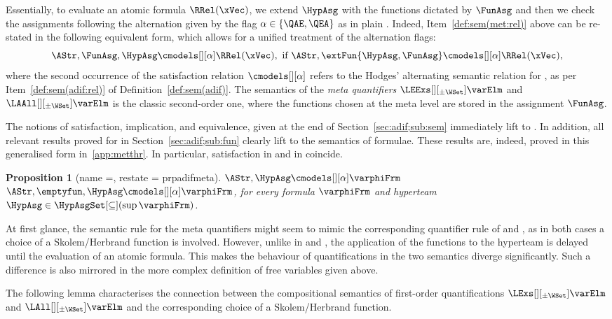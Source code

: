 \documentclass[authoryear]{elsarticle}
\newtheorem{proposition}{Proposition}
\begin{document}
Essentially, to evaluate an atomic formula $\RRel(\xVec)$, we extend $\HypAsg$
with the functions dictated by $\FunAsg$ and then we check the assignments
following the alternation given by the flag $\alpha \in \{\QAE,\QEA\}$ as in
plain \ADIF.
Indeed, Item~\ref{def:sem(met:rel)} above can be re-stated in the following
equivalent form, which allows for a unified treatment of the alternation flags:
\[
  \AStr, \FunAsg, \HypAsg \cmodels[][\alpha] \RRel(\xVec),
\text{\ if }
  \AStr, \extFun{\HypAsg, \FunAsg} \cmodels[][\alpha] \RRel(\xVec),
\]
where the second occurrence of the satisfaction relation $\cmodels[][\alpha]$
refers to the Hodges' alternating semantic relation for \ADIF, as per
Item~\ref{def:sem(adif:rel)} of Definition~\ref{def:sem(adif)}.
%
The semantics of the \emph{meta quantifiers} $\LEExs[][_{\pm\WSet}] \varElm$ and
$\LAAll[][_{\pm\WSet}] \varElm$ is the classic second-order one, where the
functions chosen at the meta level are stored in the assignment $\FunAsg$.

The notions of satisfaction, implication, and equivalence, given at the end of
Section~\ref{sec:adif;sub:sem} immediately lift to \Meta.
In addition, all relevant results proved for \ADIF in
Section~\ref{sec:adif;sub:fun} clearly lift to the \Meta semantics of \ADIF
formulae.
These results are, indeed, proved in this generalised form in~\ref{app:metthr}.
In particular, satisfaction in \ADIF and in \Meta coincide.

\begin{proposition}[name =, restate = prpadifmeta]
  \label{prp:adifmeta}
  $\AStr, \HypAsg \cmodels[][\alpha] \varphiFrm$ \iff $\AStr, \emptyfun, \HypAsg
  \cmodels[][\alpha] \varphiFrm$, for every \ADIF formula $\varphiFrm$ and
  hyperteam $\HypAsg \in \HypAsgSet[\subseteq](\sup{\varphiFrm})$.
\end{proposition}

At first glance, the semantic rule for the meta quantifiers might seem to mimic
the corresponding quantifier rule of \DIF and \TL, as in both cases a choice of
a Skolem/Herbrand function is involved.
However, unlike in \DIF and \TL, the application of the functions to the
hyperteam is delayed until the evaluation of an atomic formula.
This makes the behaviour of quantifications in the two semantics diverge
significantly.
Such a difference is also mirrored in the more complex definition of free
variables given above.

The following lemma characterises the connection between the compositional
semantics of first-order quantifications $\LExs[][_{\pm\WSet}] \varElm$ and
$\LAll[][_{\pm\WSet}] \varElm$ and the corresponding choice of a Skolem/Herbrand
function.
\end{document}

